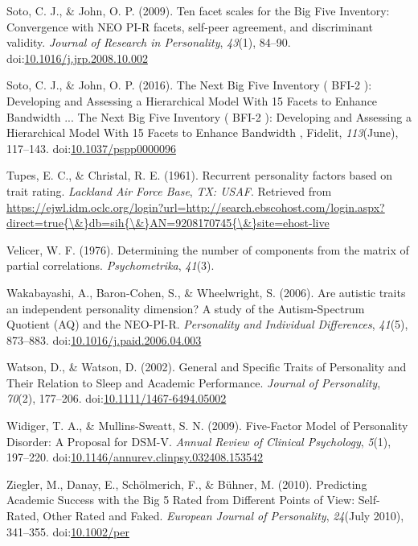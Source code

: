 \documentclass[,man,floatsintext]{apa6}
\begin{document}
\hypertarget{ref-SotoJohn2009}{}
Soto, C. J., \& John, O. P. (2009). Ten facet scales for the Big Five
Inventory: Convergence with NEO PI-R facets, self-peer agreement, and
discriminant validity. \emph{Journal of Research in Personality},
\emph{43}(1), 84--90.
doi:\href{https://doi.org/10.1016/j.jrp.2008.10.002}{10.1016/j.jrp.2008.10.002}

\hypertarget{ref-SotoJohn2016}{}
Soto, C. J., \& John, O. P. (2016). The Next Big Five Inventory ( BFI-2
): Developing and Assessing a Hierarchical Model With 15 Facets to
Enhance Bandwidth ... The Next Big Five Inventory ( BFI-2 ): Developing
and Assessing a Hierarchical Model With 15 Facets to Enhance Bandwidth ,
Fidelit, \emph{113}(June), 117--143.
doi:\href{https://doi.org/10.1037/pspp0000096}{10.1037/pspp0000096}

\hypertarget{ref-TupesChristal1961}{}
Tupes, E. C., \& Christal, R. E. (1961). Recurrent personality factors
based on trait rating. \emph{Lackland Air Force Base}, \emph{TX: USAF}.
Retrieved from
\href{https://ejwl.idm.oclc.org/login?url=http://search.ebscohost.com/login.aspx?direct=true\%7B/\&\%7Ddb=sih\%7B/\&\%7DAN=9208170745\%7B/\&\%7Dsite=ehost-live}{https://ejwl.idm.oclc.org/login?url=http://search.ebscohost.com/login.aspx?direct=true\{\textbackslash{}\&\}db=sih\{\textbackslash{}\&\}AN=9208170745\{\textbackslash{}\&\}site=ehost-live}

\hypertarget{ref-Velicer1976}{}
Velicer, W. F. (1976). Determining the number of components from the
matrix of partial correlations. \emph{Psychometrika}, \emph{41}(3).

\hypertarget{ref-Wakabayashi2006}{}
Wakabayashi, A., Baron-Cohen, S., \& Wheelwright, S. (2006). Are
autistic traits an independent personality dimension? A study of the
Autism-Spectrum Quotient (AQ) and the NEO-PI-R. \emph{Personality and
Individual Differences}, \emph{41}(5), 873--883.
doi:\href{https://doi.org/10.1016/j.paid.2006.04.003}{10.1016/j.paid.2006.04.003}

\hypertarget{ref-Watson2002}{}
Watson, D., \& Watson, D. (2002). General and Specific Traits of
Personality and Their Relation to Sleep and Academic Performance.
\emph{Journal of Personality}, \emph{70}(2), 177--206.
doi:\href{https://doi.org/10.1111/1467-6494.05002}{10.1111/1467-6494.05002}

\hypertarget{ref-WidigerMullins2009}{}
Widiger, T. A., \& Mullins-Sweatt, S. N. (2009). Five-Factor Model of
Personality Disorder: A Proposal for DSM-V. \emph{Annual Review of
Clinical Psychology}, \emph{5}(1), 197--220.
doi:\href{https://doi.org/10.1146/annurev.clinpsy.032408.153542}{10.1146/annurev.clinpsy.032408.153542}

\hypertarget{ref-Ziegler2010}{}
Ziegler, M., Danay, E., Schölmerich, F., \& Bühner, M. (2010).
Predicting Academic Success with the Big 5 Rated from Different Points
of View: Self-Rated, Other Rated and Faked. \emph{European Journal of
Personality}, \emph{24}(July 2010), 341--355.
doi:\href{https://doi.org/10.1002/per}{10.1002/per}

\endgroup

\clearpage

\renewcommand{\listtablename}{Table captions}

\listoftables
\end{document}
